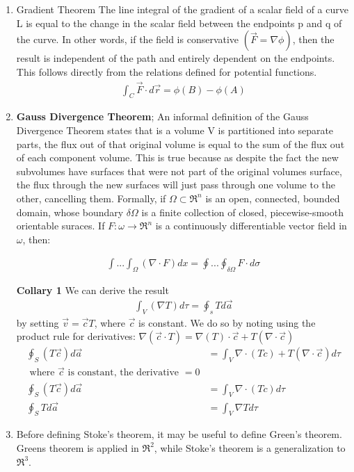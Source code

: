 \documentclass{book}
\begin{document}
\begin{enumerate}
	\item Gradient Theorem The line integral of the gradient of a scalar field of a curve L is equal to the change in the scalar field between the endpoints p and q of the curve. In other words, if the field is conservative  $(\vec{F} = \nabla \phi)$, then the result is independent of the path and entirely dependent on the endpoints. This follows directly from the relations defined for potential functions.
	\begin{align*}
		\int_C \vec{F} \cdot d\vec{r} = \phi(B) - \phi(A)
	\end{align*}
	
	\item \textbf{Gauss Divergence Theorem}; An informal definition of the Gauss Divergence Theorem states that is a volume V is partitioned into separate parts, the flux out of that original volume is equal to the sum of the flux out of each component volume. This is true because as despite the fact the new subvolumes have surfaces that were not part of the original volumes surface, the flux through the new surfaces will just pass through one volume to the other, cancelling them. \newline
	Formally, if $\Omega \subset \Re^n$ is an open, connected, bounded domain, whose boundary $\delta \Omega$ is a finite collection of closed, piecewise-smooth orientable suraces. If $F: \omega \xrightarrow{}\Re^n$ is a continuously differentiable vector field in $\omega$, then:
	
	\begin{align*}
		\int ... \int_{\Omega} (\nabla \cdot F) dx = \oint ... \oint_{\delta \Omega} F \cdot d\sigma
	\end{align*}
	
	\subitem \textbf {Collary 1} We can derive the result
	\begin{align*}
		\int_V (\nabla T) d\tau = \oint_s T d\vec{a}
	\end{align*}
	by setting $\vec{v}=\vec{c}T$, where $\vec{c}$ is constant. We do so by noting using the product rule for derivatives: $\nabla(\vec{c} \cdot T) = \nabla(T) \cdot \vec{c} + T(\nabla \cdot \vec{c})$
	\begin{align*}
		\oint_S (T\vec{c}) d\vec{a} &= \int_{V} \nabla \cdot (Tc) + T(\nabla \cdot \vec{c}) d \tau \\
		\text{ where $\vec{c}$ is constant, the derivative $=0$} \\
		\oint_S (T\vec{c}) d\vec{a} &= \int_{V} \nabla \cdot (Tc) d \tau \\
		\oint_S T d\vec{a} &=\int_V {\nabla T} d\tau 
	\end{align*}
	\item Before defining Stoke's theorem, it may be useful to define Green's theorem. Greens theorem is applied in \(\Re^2\), while Stoke's theorem is a generalization to \(\Re^3\). 
	

\end{enumerate}
\end{document}
